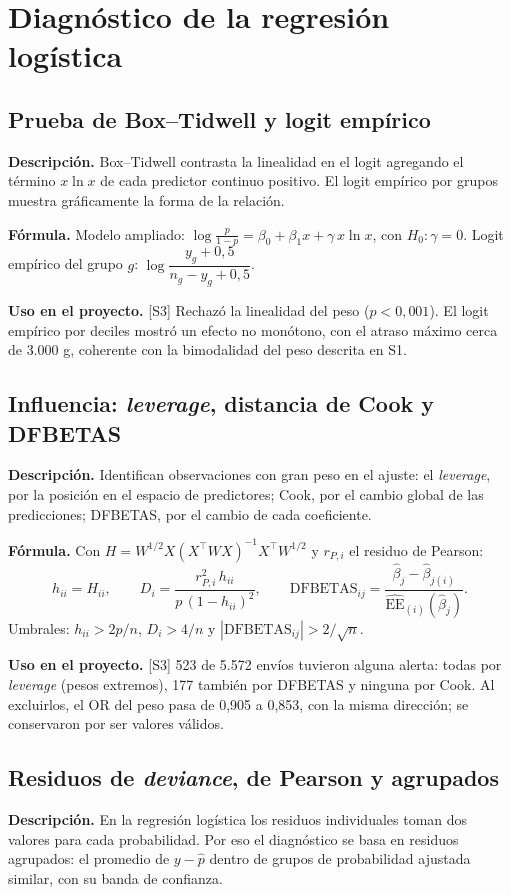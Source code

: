 \documentclass[11pt,a4paper]{article}
\newcommand{\desc}{\textbf{Descripción.} }
\newcommand{\formula}{\textbf{Fórmula.} }
\newcommand{\uso}{\textbf{Uso en el proyecto.} }
\newcommand{\fase}[1]{{\footnotesize\color{gris}[#1]}}
\begin{document}
\section{Diagnóstico de la regresión logística}\label{sec:diagnostico}

\subsection{Prueba de Box--Tidwell y logit empírico}
\desc Box--Tidwell contrasta la linealidad en el logit agregando el término $x\ln x$ de cada predictor continuo positivo. El logit empírico por grupos muestra gráficamente la forma de la relación.

\formula Modelo ampliado: $\log\frac{p}{1-p}=\beta_0+\beta_1x+\gamma\,x\ln x$, con $H_0:\gamma=0$. Logit empírico del grupo $g$: $\log\dfrac{y_g+0{,}5}{n_g-y_g+0{,}5}$.

\uso \fase{S3} Rechazó la linealidad del peso ($p<0{,}001$). El logit empírico por deciles mostró un efecto no monótono, con el atraso máximo cerca de 3.000 g, coherente con la bimodalidad del peso descrita en S1.

\subsection{Influencia: \emph{leverage}, distancia de Cook y DFBETAS}
\desc Identifican observaciones con gran peso en el ajuste: el \emph{leverage}, por la posición en el espacio de predictores; Cook, por el cambio global de las predicciones; DFBETAS, por el cambio de cada coeficiente.

\formula Con $H=W^{1/2}X(X^\top WX)^{-1}X^\top W^{1/2}$ y $r_{P,i}$ el residuo de Pearson:
\[
h_{ii}=H_{ii},\qquad D_i=\frac{r_{P,i}^2\,h_{ii}}{p\,(1-h_{ii})^2},\qquad \mathrm{DFBETAS}_{ij}=\frac{\hat\beta_j-\hat\beta_{j(i)}}{\widehat{\mathrm{EE}}_{(i)}(\hat\beta_j)} .
\]
Umbrales: $h_{ii}>2p/n$, $D_i>4/n$ y $|\mathrm{DFBETAS}_{ij}|>2/\sqrt n$.

\uso \fase{S3} 523 de 5.572 envíos tuvieron alguna alerta: todas por \emph{leverage} (pesos extremos), 177 también por DFBETAS y ninguna por Cook. Al excluirlos, el OR del peso pasa de 0,905 a 0,853, con la misma dirección; se conservaron por ser valores válidos.

\subsection{Residuos de \emph{deviance}, de Pearson y agrupados}
\desc En la regresión logística los residuos individuales toman dos valores para cada probabilidad. Por eso el diagnóstico se basa en residuos agrupados: el promedio de $y-\hat p$ dentro de grupos de probabilidad ajustada similar, con su banda de confianza.
\end{document}
